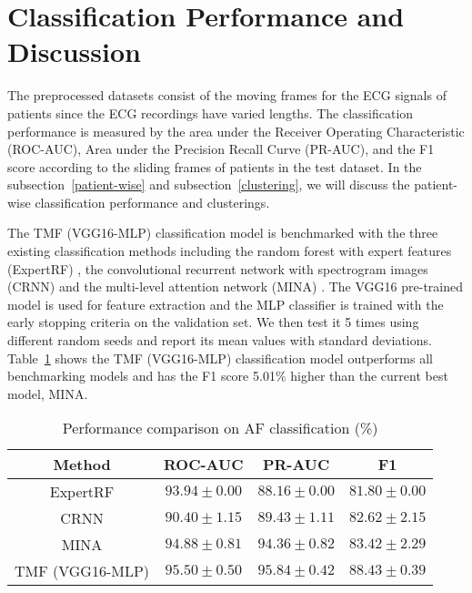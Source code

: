\documentclass[journal]{IEEEtran}
\begin{document}
\section{Classification Performance and Discussion} \label{sec:benchmark}

The preprocessed datasets consist of the moving frames for the ECG signals of patients since the ECG recordings have varied lengths. 
The classification performance is measured by the area under the Receiver Operating Characteristic (ROC-AUC), Area under the Precision Recall Curve (PR-AUC), and the F1 score according to the sliding frames of patients in the test dataset. In the subsection~\ref{patient-wise} and subsection~\ref{clustering}, we will discuss the patient-wise classification performance and clusterings.

The TMF (VGG16-MLP) classification model is benchmarked with the three existing classification methods including the random forest with expert features (ExpertRF) \cite{mina_2019}, the convolutional recurrent network with spectrogram images (CRNN) \cite{CRNN_ECG_2017} and the multi-level attention network (MINA) \cite{mina_2019}. The VGG16 pre-trained model is used for feature extraction and the MLP classifier is trained with the early stopping criteria on the validation set. We then test it 5 times using different random seeds and report its mean values with standard deviations. 
Table~\ref{tab:result-AF} shows the TMF (VGG16-MLP) classification model outperforms all benchmarking models and has the F1 score 5.01\% higher than the current best model, MINA.

\begin{table}[H]
  \caption{Performance comparison on AF classification (\%)}
  \centering
  \begin{tabular}{cccc}
  \hline
  Method     &   ROC-AUC   &   PR-AUC  & F1  \\ 
  \hline
  ExpertRF   &   $93.94\pm0.00$    &  $88.16\pm0.00$   & $81.80\pm0.00$  \\
  CRNN       &   $90.40\pm1.15$    &  $89.43\pm1.11$   & $82.62\pm2.15$  \\
  MINA       &   $94.88\pm0.81$    &  $94.36\pm0.82$   & $83.42\pm2.29$  \\
  \hline
  TMF (VGG16-MLP) &   $\mathbf{95.50}\pm0.50$   &  $\mathbf{95.84}\pm0.42$   & $\mathbf{88.43}\pm0.39$\\
  \hline
  \end{tabular}
  \label{tab:result-AF}
\end{table}
\end{document}
